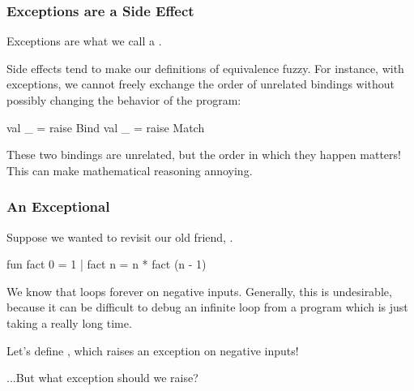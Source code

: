 \documentclass[aspectratio=169]{beamer}
\begin{document}
\begin{frame}[fragile]
  \frametitle{Exceptions are a Side Effect}

  Exceptions are what we call a .

  \vspace{\fill}


  \vspace{\fill}

  Side effects tend to make our definitions of equivalence fuzzy. For instance,
  with exceptions, we cannot freely exchange the order of unrelated
   bindings without possibly changing the behavior of the program:  
  \begin{codeblock}
    val _ = raise Bind 
    val _ = raise Match 
  \end{codeblock} 
  These two bindings are unrelated, but the order in which they happen 
  matters! This can make mathematical reasoning annoying.
\end{frame}


\begin{frame}[fragile]
  \frametitle{An Exceptional }

  Suppose we wanted to revisit our old friend, .

  \begin{codeblock}
    fun fact 0 = 1
      | fact n = n * fact (n - 1)
  \end{codeblock}

  \vspace{\fill}

  We know that  loops forever on negative inputs. Generally,
  this is undesirable, because it can be difficult to debug an infinite
  loop from a program which is just taking a really long time.

  \vspace{\fill}

  Let's define \footnotemark, which raises an exception on negative inputs!

  \vspace{\fill}

  ...But what exception should we raise?

\end{frame}
\end{document}
